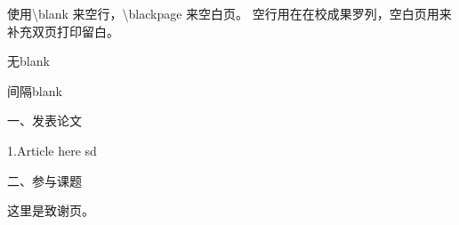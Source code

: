 \documentclass[AutoFakeBold]{LZUThesis-PgD&PhD}
\begin{document}
使用\textbackslash blank 来空行，\textbackslash blackpage 来空白页。
空行用在在校成果罗列，空白页用来补充双页打印留白。

无blank

\blank

间隔blank
\blankpage




\backmatter


\printbib



\Achievements
一、发表论文

1.Article here sd

\blank

二、参与课题




\Thanks

这里是致谢页。
\end{document}
